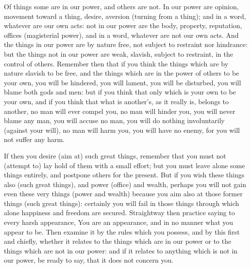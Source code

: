 Of things some are in our power, and  others are not. In our power are opinion,
movement toward  a thing,  desire, aversion  (turning from a  thing); and  in a
word, whatever  are our  own acts:  not in  our power  are the  body, property,
reputation, offices  (magisterial power), and in  a word, whatever are  not our
own  acts. And  the things  in our  power are  by nature  free, not  subject to
restraint nor  hindrance: but the  things not in  our power are  weak, slavish,
subject to restraint, in the control of others. Remember then that if you think
the things which are by nature slavish to  be free, and the things which are in
the power of others to be your own,  you will be hindered, you will lament, you
will be disturbed, you will blame both gods and men: but if you think that only
which is your own  to be your own, and if you think  that what is another's, as
it really  is, belongs to  another, no  man will ever  compel you, no  man will
hinder you, you will  never blame any man, you will accuse no  man, you will do
nothing involuntarily (against your will), no  man will harm you, you will have
no enemy, for you will not suffer any harm.

If then  you desire  (aim at)  such great  things, remember  that you  must not
(attempt to)  lay hold of them  with a small  effort; but you must  leave alone
some things  entirely, and  postpone others  for the present.  But if  you wish
these things also  (such great things), and power (office)  and wealth, perhaps
you will  not gain even  these very things (power  and wealth) because  you aim
also at  those former things  (such great things):  certainly you will  fail in
those things through which alone happiness and freedom are secured. Straightway
then practice saying  to every harsh appearance, You are  an appearance, and in
no  manner what  you appear  to be.  Then  examine it  by the  rules which  you
possess, and by this first and chiefly,  whether it relates to the things which
are in our power or to the things which are not in our power: and if it relates
to anything  which is  not in  our power,  be ready  to say,  that it  does not
concern you.
